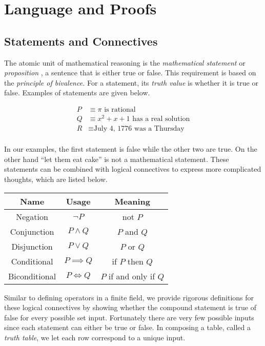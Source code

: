 \documentclass[twoside]{report}
\begin{document}
\chapter{Language and Proofs}
\section{Statements and Connectives}
The atomic unit of mathematical reasoning is the \emph{mathematical statement} or \emph{proposition} , a sentence that is either true or false. This requirement is based on the \emph{principle of bivalence.} For a statement, its \emph{truth value} is whether it is true or false. Examples of statements are given below.

\begin{align*}
	P &\equiv \text{$\pi$ is rational} \\
	Q &\equiv \text{$x^2 + x + 1$ has a real solution} \\
	R &\equiv \text{July 4, 1776 was a Thursday} \\
\end{align*}
 
In our examples, the first statement is false while the other two are true. On the other hand ``let them eat cake'' is not a mathematical statement. These statements can be combined with logical connectives to express more complicated thoughts, which are listed below.

\vspace{\baselineskip}
\begin{center}
	\begin{tabular}{ccc}
		\toprule
		Name & Usage & Meaning \\
		\midrule
		Negation & $\neg P$ & not $P$ \\
		Conjunction & $P \wedge Q$ & $P$ and $Q$ \\
		Disjunction & $P \lor Q$ & $P$ or $Q$ \\
		Conditional & $P \implies Q$ & if $P$ then $Q$ \\
		Biconditional & $P \iff Q$ & $P$ if and only if $Q$ \\
		\bottomrule
	\end{tabular}
\end{center} 
\vspace{\baselineskip}

Similar to defining operators in a finite field, we provide rigorous definitions for these logical connectives by showing whether the compound statement is true of false for every possible set input. Fortunately there are very few possible inputs since each statement can either be true or false. In composing a table, called a \emph{truth table},  we let each row correspond to a unique input.
\end{document}
